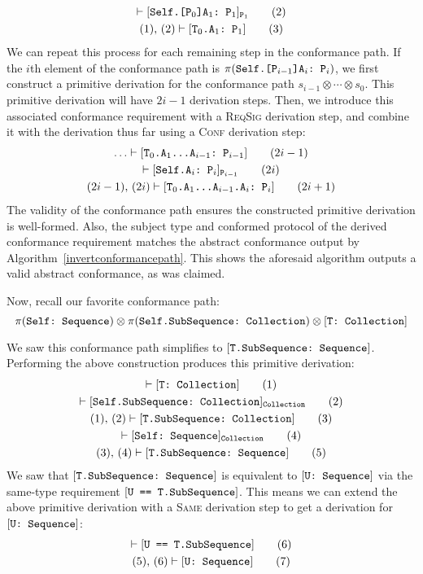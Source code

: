 \documentclass[../generics]{subfiles}
\begin{document}
\begin{gather*}
\vdash[\texttt{Self.[$\texttt{P}_0$]$\texttt{A}_1$:~$\texttt{P}_1$}]_{\texttt{P}_1}\tag{2}\\
(1),\,(2)\vdash[\texttt{$\texttt{T}_0$.$\texttt{A}_1$:~$\texttt{P}_1$}]\tag{3}
\end{gather*}
We can repeat this process for each remaining step in the conformance path. If the $i$th element of the conformance path is $\pi(\texttt{Self.[$\texttt{P}_{i-1}$]$\texttt{A}_i$:~$\texttt{P}_i$})$, we first construct a primitive derivation for the conformance path $s_{i-1}\otimes\cdots\otimes s_0$. This primitive derivation will have $2i-1$ derivation steps. Then, we introduce this associated conformance requirement with a \textsc{ReqSig} derivation step, and combine it with the derivation thus far using a \textsc{Conf} derivation step:
\begin{gather*}
\ldots\vdash[\texttt{$\texttt{T}_0$.$\texttt{A}_1$...$\texttt{A}_{i-1}$:~$\texttt{P}_{i-1}$}]\tag{$2i-1$}\\
\vdash[\texttt{Self.$\texttt{A}_i$:~$\texttt{P}_i$}]_{\texttt{P}_{i-1}}\tag{$2i$}\\
(2i-1),\,(2i)\vdash[\texttt{$\texttt{T}_0$.$\texttt{A}_1$...$\texttt{A}_{i-1}$.$\texttt{A}_i$:~$\texttt{P}_i$}]\tag{$2i+1$}
\end{gather*}
The validity of the conformance path ensures the constructed primitive derivation is well-formed. Also, the subject type and conformed protocol of the derived conformance requirement matches the abstract conformance output by Algorithm~\ref{invertconformancepath}. This shows the aforesaid algorithm outputs a valid abstract conformance, as was claimed.

Now, recall our favorite conformance path:
\[\pi(\texttt{Self:~Sequence}) \otimes \pi(\texttt{Self.SubSequence:~Collection}) \otimes [\texttt{T:~Collection}]\]

We saw this conformance path simplifies to $[\texttt{T.SubSequence:~Sequence}]$. Performing the above construction produces this primitive derivation:
\begin{gather*}
\vdash[\texttt{T:~Collection}]\tag{1}\\
\vdash[\texttt{Self.SubSequence:~Collection}]_\texttt{Collection}\tag{2}\\
(1),\,(2)\vdash[\texttt{T.SubSequence:~Collection}]\tag{3}\\
\vdash[\texttt{Self:~Sequence}]_\texttt{Collection}\tag{4}\\
(3),\,(4)\vdash[\texttt{T.SubSequence:~Sequence}]\tag{5}
\end{gather*}
We saw that $[\texttt{T.SubSequence:~Sequence}]$ is equivalent to $[\texttt{U:~Sequence}]$ via the same-type requirement $[\texttt{U == T.SubSequence}]$. This means we can extend the above primitive derivation with a \textsc{Same} derivation step to get a derivation for $[\texttt{U:~Sequence}]$:
\begin{gather*}
\vdash[\texttt{U == T.SubSequence}]\tag{6}\\
(5),\,(6)\vdash[\texttt{U:~Sequence}]\tag{7}
\end{gather*}
\end{document}
